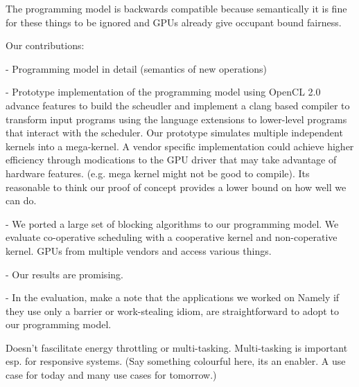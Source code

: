 \documentclass[nocopyrightspace]{sigplanconf-pldi16}
\begin{document}
  The programming model is backwards compatible because semantically
  it is fine for these things to be ignored and GPUs already give
  occupant bound fairness. 

  Our contributions:

  - Programming model in detail (semantics of new operations)

  - Prototype implementation of the programming model using OpenCL 2.0
    advance features to build the scheudler and implement a clang
    based compiler to transform input programs using the language
    extensions to lower-level programs that interact with the
    scheduler. Our prototype simulates multiple independent kernels
    into a mega-kernel. A vendor specific implementation could achieve
    higher efficiency through modications to the GPU driver that may
    take advantage of hardware features. (e.g. mega kernel might not
    be good to compile). Its reasonable to think our proof of concept
    provides a lower bound on how well we can do.

  - We ported a large set of blocking algorithms to our programming
    model. We evaluate co-operative scheduling with a cooperative
    kernel and non-coperative kernel. GPUs from multiple vendors and
    access various things. 

  - Our results are promising.

  - In the evaluation, make a note that the applications we worked on
    Namely if they use only a barrier or work-stealing idiom, are
    straightforward to adopt to our programming model.




  Doesn't fascilitate energy throttling or
  multi-tasking. Multi-tasking is important esp. for responsive
  systems. (Say something colourful here, its an enabler. A use case
  for today and many use cases for tomorrow.)
\end{document}
